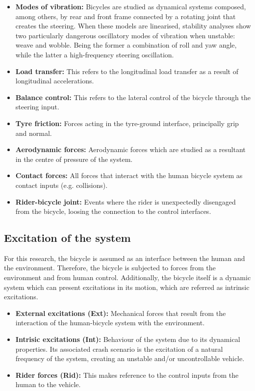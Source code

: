 \documentclass{article}
\begin{document}
\begin{itemize}
    \item \textbf{Modes of vibration:} Bicycles are studied as dynamical systems composed, among others, by rear and front frame connected by a rotating joint that creates the steering.
        When these models are linearised, stability analyses show two particularly dangerous oscillatory modes of vibration when unstable: weave and wobble.
        Being the former a combination of roll and yaw angle, while the latter a high-frequency steering oscillation.
    \item \textbf{Load transfer:} This refers to the longitudinal load transfer as a result of longitudinal accelerations.
    \item \textbf{Balance control:} This refers to the lateral control of the bicycle through the steering input.
    \item \textbf{Tyre friction:} Forces acting in the tyre-ground interface, principally grip and normal.
    \item \textbf{Aerodynamic forces:} Aerodynamic forces which are studied as a resultant in the centre of pressure of the system.
    \item \textbf{Contact forces:} All forces that interact with the human bicycle system as contact inputs (e.g. collisions).
    \item \textbf{Rider-bicycle joint:} Events where the rider is unexpectedly disengaged from the bicycle, loosing the connection to the control interfaces.
\end{itemize}


\subsection{Excitation of the system}

For this research, the bicycle is assumed as an interface between the human and the environment.
%
Therefore, the bicycle is subjected to forces from the environment and from human control.
%
Additionally, the bicycle itself is a dynamic system which can present excitations in its motion, which are referred as intrinsic excitations.


\begin{itemize}
    \item \textbf{External excitations (Ext):} Mechanical forces that result from the interaction of the human-bicycle system with the environment.
    \item \textbf{Intrisic excitations (Int):} Behaviour of the system due to its dynamical properties.
        Its associated crash scenario is the excitation of a natural frequency of the system, creating an unstable and/or uncontrollable vehicle.
    \item \textbf{Rider forces (Rid):} This makes reference to the control inputs from the human to the vehicle.
\end{itemize}
\end{document}
